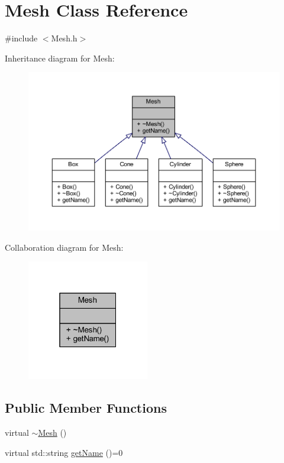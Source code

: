 \hypertarget{class_mesh}{}\section{Mesh Class Reference}
\label{class_mesh}


{\ttfamily \#include $<$Mesh.\+h$>$}



Inheritance diagram for Mesh\+:
\nopagebreak
\begin{figure}[H]
\begin{center}
\leavevmode
\includegraphics[width=350pt]{class_mesh__inherit__graph}
\end{center}
\end{figure}


Collaboration diagram for Mesh\+:
\nopagebreak
\begin{figure}[H]
\begin{center}
\leavevmode
\includegraphics[width=151pt]{class_mesh__coll__graph}
\end{center}
\end{figure}
\subsection*{Public Member Functions}
\begin{DoxyCompactItemize}
\item 
virtual \mbox{\hyperlink{class_mesh_ad6a041191ed55c693254e945ce2869ff}{$\sim$\+Mesh}} ()
\item 
virtual std\+::string \mbox{\hyperlink{class_mesh_aa131fe1c2586fe60988155db77c57272}{get\+Name}} ()=0
\end{DoxyCompactItemize}


